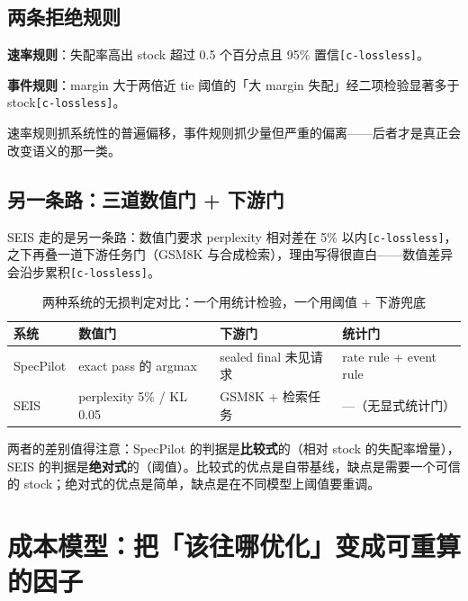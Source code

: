 \subsection{两条拒绝规则}

\textbf{速率规则}：失配率高出 stock 超过 0.5 个百分点且 95\% 置信{\scriptsize\texttt{[c-\hspace{0pt}lossless]}}。


\textbf{事件规则}：margin 大于两倍近 tie 阈值的「大 margin 失配」经二项检验显著多于 stock{\scriptsize\texttt{[c-\hspace{0pt}lossless]}}。


速率规则抓系统性的普遍偏移，事件规则抓少量但严重的偏离——后者才是真正会改变语义的那一类。


\subsection{另一条路：三道数值门 + 下游门}

SEIS 走的是另一条路：数值门要求 perplexity 相对差在 5\% 以内{\scriptsize\texttt{[c-\hspace{0pt}lossless]}}，之下再叠一道下游任务门（GSM8K 与合成检索），理由写得很直白——数值差异会沿步累积{\scriptsize\texttt{[c-\hspace{0pt}lossless]}}。


\begin{table}[t]
\centering
\footnotesize
\setlength{\tabcolsep}{4pt}
\caption{两种系统的无损判定对比：一个用统计检验，一个用阈值 + 下游兜底}
\label{tab:3}
\begin{tabular}{llll}
\toprule
系统 & 数值门 & 下游门 & 统计门 \\
\midrule
SpecPilot & exact pass 的 argmax & sealed final 未见请求 & rate rule + event rule \\
SEIS & perplexity 5\% / KL 0.05 & GSM8K + 检索任务 & —（无显式统计门） \\
\bottomrule
\end{tabular}
\end{table}

两者的差别值得注意：SpecPilot 的判据是\textbf{比较式}的（相对 stock 的失配率增量），SEIS 的判据是\textbf{绝对式}的（阈值）。比较式的优点是自带基线，缺点是需要一个可信的 stock；绝对式的优点是简单，缺点是在不同模型上阈值要重调。


\section{成本模型：把「该往哪优化」变成可重算的因子}

